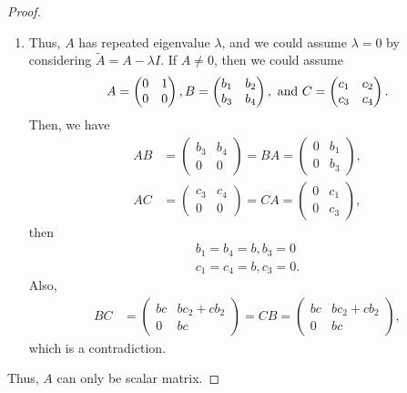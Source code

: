 \documentclass[11pt]{book}
\theoremstyle{definition}
\numberwithin{equation}{subsection}
\begin{document}
\begin{proof}
\begin{enumerate}[label=(\alph*)]
    \item Thus, $A$ has repeated eigenvalue $\lambda$, and we could assume $\lambda = 0$ by considering $\widetilde{A} = A - \lambda I$. If $A \neq 0$, then we could assume 
    \begin{align*}
        A = \begin{pmatrix}
            0 & 1 \\
            0 & 0
        \end{pmatrix}, B = \begin{pmatrix}
            b_1 & b_2 \\
            b_3 & b_4
        \end{pmatrix},\,\, {\rm and}\,\, C = \begin{pmatrix}
            c_1 & c_2 \\
            c_3 & c_4
        \end{pmatrix}.
    \end{align*}
    Then, we have
    \begin{align*}
        AB & = \begin{pmatrix}
            b_3 & b_4 \\
            0     & 0
        \end{pmatrix} = BA = \begin{pmatrix}
            0 & b_1 \\
            0 & b_3
        \end{pmatrix}, \\
        AC & = \begin{pmatrix}
            c_3 & c_4 \\
            0     & 0
        \end{pmatrix} = CA = \begin{pmatrix}
            0 & c_1 \\
            0 & c_3
        \end{pmatrix},
    \end{align*}
    then 
    \begin{align*}
        b_1 = b_4 = b, b_3 = 0 \\
        c_1 = c_4 = b, c_3 = 0.
    \end{align*}
    Also, 
    \begin{align*}
        BC & = \begin{pmatrix}
            bc & bc_2+cb_2 \\
            0     & bc
        \end{pmatrix} = CB = \begin{pmatrix}
            bc & bc_2+cb_2 \\
            0     & bc
        \end{pmatrix},
    \end{align*}
    which is a contradiction.
\end{enumerate}
Thus, $A$ can only be scalar matrix.
\end{proof}
\end{document}
